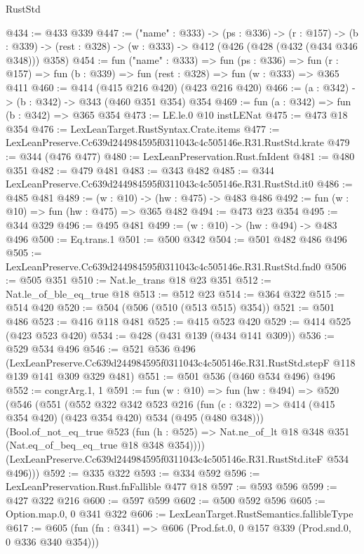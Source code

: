 \begin{lexlean}{RustStd}
\begin{coremodule}
@434 := @433 @339
@447 := ("name" : @333) ->
  (ps : @336) ->
  (r : @157) ->
  (b : @339) -> (rest : @328) -> (w : @333) -> @412 (@426 (@428 (@432 (@434 @346 @348))) @358)
@454 := fun ("name" : @333) =>
  fun (ps : @336) =>
  fun (r : @157) => fun (b : @339) => fun (rest : @328) => fun (w : @333) => @365 @411
@460 := @414 (@415 @216 @420) (@423 @216 @420)
@466 := (a : @342) -> (b : @342) -> @343 (@460 @351 @354) @354
@469 := fun (a : @342) => fun (b : @342) => @365 @354
@473 := LE.le.{0} @10 instLENat
@475 := @473 @18 @354
@476 := LexLeanTarget.RustSyntax.Crate.items
@477 := LexLeanPreserve.Cc639d244984595f0311043c4c505146e.R31.RustStd.krate
@479 := @344 (@476 @477)
@480 := LexLeanPreservation.Rust.fnIdent
@481 := @480 @351
@482 := @479 @481
@483 := @343 @482
@485 := @344 LexLeanPreserve.Cc639d244984595f0311043c4c505146e.R31.RustStd.it0
@486 := @485 @481
@489 := (w : @10) -> (hw : @475) -> @483 @486
@492 := fun (w : @10) => fun (hw : @475) => @365 @482
@494 := @473 @23 @354
@495 := @344 @329
@496 := @495 @481
@499 := (w : @10) -> (hw : @494) -> @483 @496
@500 := Eq.trans.{1}
@501 := @500 @342
@504 := @501 @482 @486 @496
@505 := LexLeanPreserve.Cc639d244984595f0311043c4c505146e.R31.RustStd.fnd0
@506 := @505 @351
@510 := Nat.le_trans @18 @23 @351
@512 := Nat.le_of_ble_eq_true @18
@513 := @512 @23
@514 := @364 @322
@515 := @514 @420
@520 := @504 (@506 (@510 (@513 @515) @354))
@521 := @501 @486
@523 := @416 @118 @481
@525 := @415 @523 @420
@529 := @414 @525 (@423 @523 @420)
@534 := @428 (@431 @139 (@434 @141 @309))
@536 := @529 @534 @496
@546 := @521
    @536
    @496
    (LexLeanPreserve.Cc639d244984595f0311043c4c505146e.R31.RustStd.stepF
      @118
      @139
      @141
      @309
      @329
      @481)
@551 := @501 @536 (@460 @534 @496) @496
@552 := congrArg.{1, 1}
@591 := fun (w : @10) =>
  fun (hw : @494) =>
  @520
    (@546
      (@551
        (@552
          @322
          @342
          @523
          @216
          (fun (c : @322) => @414 (@415 @354 @420) (@423 @354 @420) @534 (@495 (@480 @348)))
          (Bool.of_not_eq_true
            @523
            (fun (h : @525) => Nat.ne_of_lt @18 @348 @351 (Nat.eq_of_beq_eq_true @18 @348 @354))))
        (LexLeanPreserve.Cc639d244984595f0311043c4c505146e.R31.RustStd.iteF @534 @496)))
@592 := @335 @322
@593 := @334 @592
@596 := LexLeanPreservation.Rust.fnFallible @477 @18
@597 := @593 @596
@599 := @427 @322 @216
@600 := @597 @599
@602 := @500 @592 @596
@605 := Option.map.{0, 0} @341 @322
@606 := LexLeanTarget.RustSemantics.fallibleType
@617 := @605 (fun (fn : @341) => @606 (Prod.fst.{0, 0} @157 @339 (Prod.snd.{0, 0} @336 @340 @354)))

\end{coremodule}
\end{lexlean}
